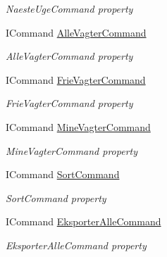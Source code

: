 \begin{DoxyCompactItemize}
\begin{DoxyCompactList}\small\item\em Naeste\+Uge\+Command property \end{DoxyCompactList}\item 
I\+Command \hyperlink{class__1aarsproeve_1_1_view_model_1_1_vagtplan_view_model_a9ff1365b62555d179cf34a5e11a6d5fc}{Alle\+Vagter\+Command}
\begin{DoxyCompactList}\small\item\em Alle\+Vagter\+Command property \end{DoxyCompactList}\item 
I\+Command \hyperlink{class__1aarsproeve_1_1_view_model_1_1_vagtplan_view_model_ac17a43f67342176e4a94bea072876d9c}{Frie\+Vagter\+Command}
\begin{DoxyCompactList}\small\item\em Frie\+Vagter\+Command property \end{DoxyCompactList}\item 
I\+Command \hyperlink{class__1aarsproeve_1_1_view_model_1_1_vagtplan_view_model_abded4dcbd3699986defbf179b9d52001}{Mine\+Vagter\+Command}
\begin{DoxyCompactList}\small\item\em Mine\+Vagter\+Command property \end{DoxyCompactList}\item 
I\+Command \hyperlink{class__1aarsproeve_1_1_view_model_1_1_vagtplan_view_model_aa57320a9de71c8c0cd393e0fc2dd8eca}{Sort\+Command}
\begin{DoxyCompactList}\small\item\em Sort\+Command property \end{DoxyCompactList}\item 
I\+Command \hyperlink{class__1aarsproeve_1_1_view_model_1_1_vagtplan_view_model_aaacfd0f73f0fe5a3784fda8f7fb0c045}{Eksporter\+Alle\+Command}
\begin{DoxyCompactList}\small\item\em Eksporter\+Alle\+Command property \end{DoxyCompactList}\item 

\end{DoxyCompactItemize}
